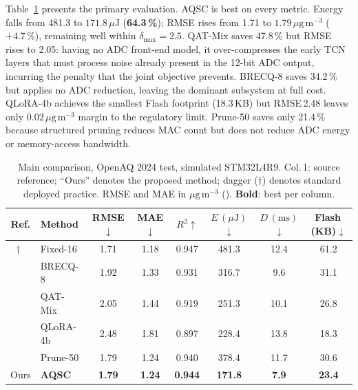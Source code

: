 \documentclass[12pt,a4paper]{article}
\begin{document}
Table~\ref{tab:main} presents the primary evaluation.
AQSC is best on every metric.
Energy falls from 481.3 to $171.8\,\mu$J (\textbf{64.3\,\%});
 RMSE rises from 1.71 to $1.79\,\mu\mathrm{g\,m^{-3}}$
($+4.7\,\%$), remaining well within $\delta_\mathrm{max}=2.5$.
QAT-Mix saves 47.8\,\% but RMSE rises to 2.05: having no ADC
front-end model, it over-compresses the early TCN layers that must
process noise already present in the 12-bit ADC output, incurring
the penalty that the joint objective prevents.
BRECQ-8 saves 34.2\,\% but applies no ADC reduction, leaving the
dominant subsystem at full cost.
QLoRA-4b achieves the smallest Flash footprint (18.3\,KB) but
RMSE\,2.48 leaves only $0.02\,\mu\mathrm{g\,m^{-3}}$ margin to the
regulatory limit.
Prune-50 saves only 21.4\,\% because structured pruning reduces MAC
count but does not reduce ADC energy or memory-access bandwidth.

\begin{table}[ht]
\centering
\caption{Main comparison, OpenAQ 2024 test, simulated STM32L4R9.
Col.\,1: source reference; ``Ours'' denotes the proposed method;
dagger ($\dagger$) denotes standard deployed practice.
RMSE and MAE in $\mu\mathrm{g\,m^{-3}}$ ().
\textbf{Bold}: best per column.}
\label{tab:main}
\setlength{\tabcolsep}{3.5pt}
\begin{tabular}{@{}clcccccc@{}}
\toprule
\textbf{Ref.} & \textbf{Method} &
\textbf{RMSE}$\downarrow$ & \textbf{MAE}$\downarrow$ & $R^2$$\uparrow$ &
$E\,(\mu\mathrm{J})$$\downarrow$ & $D\,(\mathrm{ms})$$\downarrow$ &
Flash\,(KB)$\downarrow$ \\
\midrule
$\dagger$~\cite{ma2023aqedge,chen2023tinyml}
                            & Fixed-16  & 1.71           & 1.18          & 0.947          & 481.3          & 12.4         & 61.2 \\
\cite{li2021brecq}          & BRECQ-8   & 1.92           & 1.33          & 0.931          & 316.7          &  9.6         & 31.1 \\
\cite{xiao2023smoothquant}  & QAT-Mix   & 2.05           & 1.44          & 0.919          & 251.3          & 10.1         & 26.8 \\
\cite{dettmers2023qlora}    & QLoRA-4b  & 2.48           & 1.81          & 0.897          & 228.4          & 13.8         & 18.3 \\
\cite{frantar2023sparsegpt} & Prune-50  & 1.79           & 1.24          & 0.940          & 378.4          & 11.7         & 30.6 \\
Ours                        & \textbf{AQSC}& \textbf{1.79}& \textbf{1.24}& \textbf{0.944} & \textbf{171.8} & \textbf{7.9} & \textbf{23.4}\\
\bottomrule
\end{tabular}
\end{table}
\end{document}
